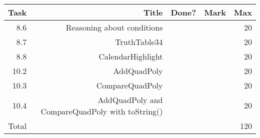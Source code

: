 \\ \\ \\ \noindent\parbox[l]{\textwidth}{
 \\ \\
\begin{tabular}{||r|r|r|r|r||} \hline \hline
Task  & Title                            & Done? & Mark & Max \\ \hline
8.6 & Reasoning about conditions & & & 20 \\ \hline
8.7 & TruthTable34 & & & 20 \\ \hline
8.8 & CalendarHighlight & & & 20 \\ \hline
10.2 & AddQuadPoly & & & 20 \\ \hline
10.3 & CompareQuadPoly & & & 20 \\ \hline
10.4 & AddQuadPoly and CompareQuadPoly with toString() & & & 20 \\ \hline
\hline
Total &                                  &       &      & 120 \\ \hline
\hline
\end{tabular} \\ \\
}
